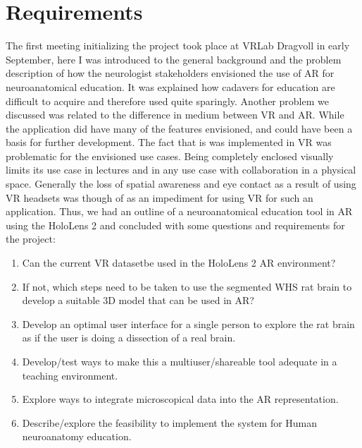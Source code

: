 \chapter{Requirements}\label{chap:req}



%
%


The first meeting initializing the project took place at VRLab Dragvoll in early September, here I was introduced to the general background and the problem description of how the neurologist stakeholders envisioned the use of AR for neuroanatomical education. It was explained how cadavers for education are difficult to acquire and therefore used quite sparingly. 
Another problem we discussed was related to the difference in medium between VR and AR. While the application  did have many of the features envisioned, and could have been a basis for further development. The fact that is was implemented in VR was problematic for the envisioned use cases. Being completely enclosed visually limits its use case in lectures and in any use case with collaboration in a physical space. Generally the loss of spatial awareness and eye contact as a result of using VR headsets was though of as an impediment for using VR for such an application. 
Thus, we had an outline of a neuroanatomical education tool in AR using the HoloLens 2 and concluded with some questions and requirements for the project:

\begin{enumerate}\label{mennoslist}
    \item Can the current VR dataset\footnotemark be used in the HoloLens 2 AR environment?
    \item If not, which steps need to be taken to use the segmented WHS rat brain to develop a suitable 3D model that can be used in AR?
    \item Develop an optimal user interface for a single person to explore the rat brain as if the user is doing a dissection of a real brain.
    \item Develop/test ways to make this a multiuser/shareable tool adequate in a teaching environment.
    \item Explore ways to integrate microscopical data into the AR representation.
    \item Describe/explore the feasibility to implement the system for Human neuroanatomy education.
\end{enumerate}


